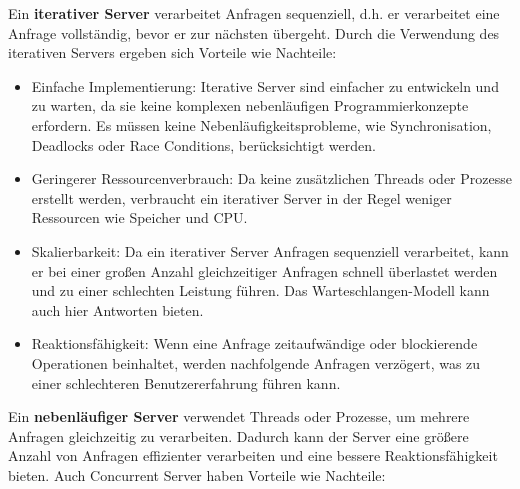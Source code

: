 Ein \textbf{iterativer Server} verarbeitet Anfragen sequenziell, d.h. er verarbeitet eine Anfrage vollständig, bevor er zur nächsten übergeht.  Durch die Verwendung des iterativen Servers ergeben sich Vorteile wie Nachteile:
\begin{itemize}
\item Einfache Implementierung: Iterative Server sind einfacher zu entwickeln und zu warten, da sie keine komplexen nebenläufigen Programmierkonzepte erfordern. Es müssen keine Nebenläufigkeitsprobleme, wie Synchronisation, Deadlocks oder Race Conditions, berücksichtigt werden.
\item Geringerer Ressourcenverbrauch: Da keine zusätzlichen Threads oder Prozesse erstellt werden, verbraucht ein iterativer Server in der Regel weniger Ressourcen wie Speicher und CPU.
\item Skalierbarkeit: Da ein iterativer Server Anfragen sequenziell verarbeitet, kann er bei einer großen Anzahl gleichzeitiger Anfragen schnell überlastet werden und zu einer schlechten Leistung führen. Das Warteschlangen-Modell kann auch hier Antworten bieten.
\item Reaktionsfähigkeit: Wenn eine Anfrage zeitaufwändige oder blockierende Operationen beinhaltet, werden nachfolgende Anfragen verzögert, was zu einer schlechteren Benutzererfahrung führen kann.
\end{itemize}
Ein \textbf{nebenläufiger Server} verwendet Threads oder Prozesse, um mehrere Anfragen gleichzeitig zu verarbeiten. Dadurch kann der Server eine größere Anzahl von Anfragen effizienter verarbeiten und eine bessere Reaktionsfähigkeit bieten. Auch Concurrent Server haben Vorteile wie Nachteile:

